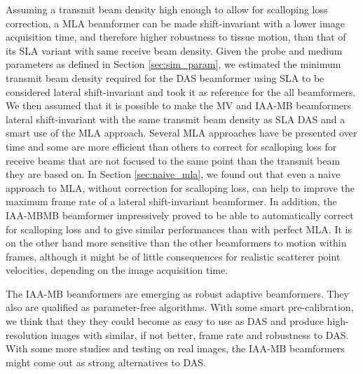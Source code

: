 Assuming a transmit beam density high enough to allow for scalloping loss correction, a MLA beamformer can be made shift-invariant with a lower image acquisition time, and therefore higher robustness to tissue motion, than that of its SLA variant with same receive beam density.
Given the probe and medium parameters as defined in Section \ref{sec:sim_param}, we estimated the minimum transmit beam density required for the DAS beamformer using SLA to be considered lateral shift-invariant and took it as reference for the all beamformers.
We then assumed that it is possible to make the MV and IAA-MB beamformers lateral shift-invariant with the same transmit beam density as SLA DAS and a smart use of the MLA approach.
Several MLA approaches have be presented over time and some are more efficient than others to correct for scalloping loss for receive beams that are not focused to the same point than the transmit beam they are based on.
In Section \ref{sec:naive_mla}, we found out that even a naive approach to MLA, without correction for scalloping loss, can help to improve the maximum frame rate of a lateral shift-invariant beamformer.
In addition, the IAA-MBMB beamformer impressively proved to be able to automatically correct for scalloping loss and to give similar performances than with perfect MLA.
It is on the other hand more sensitive than the other beamformers to motion within frames, although it might be of little consequences for realistic scatterer point velocities, depending on the image acquisition time.

The IAA-MB beamformers are emerging as robust adaptive beamformers.
They also are qualified as parameter-free algorithms. With some smart pre-calibration, we think that they they could become as easy to use as DAS and produce high-resolution images with similar, if not better, frame rate and robustness to DAS.
With some more studies and testing on real images, the IAA-MB beamformers might come out as strong alternatives to DAS.

